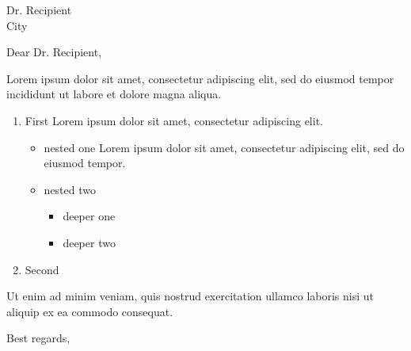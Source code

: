 \documentclass{letter}
\begin{document}
\begin{letter}{Dr. Recipient \\ City}
\opening{Dear Dr. Recipient,}

Lorem ipsum dolor sit amet, consectetur adipiscing elit, sed do eiusmod tempor incididunt ut labore et dolore magna aliqua.
\begin{enumerate}
\item First Lorem ipsum dolor sit amet, consectetur adipiscing elit.
\begin{itemize}
\item nested one Lorem ipsum dolor sit amet, consectetur adipiscing elit, sed do eiusmod tempor.
\item nested two
\begin{itemize}
\item deeper one
\item deeper two
\end{itemize}
\end{itemize}
\item Second
\end{enumerate}
Ut enim ad minim veniam, quis nostrud exercitation ullamco laboris nisi ut aliquip ex ea commodo consequat.

\closing{Best regards,}
\end{letter}
\end{document}

